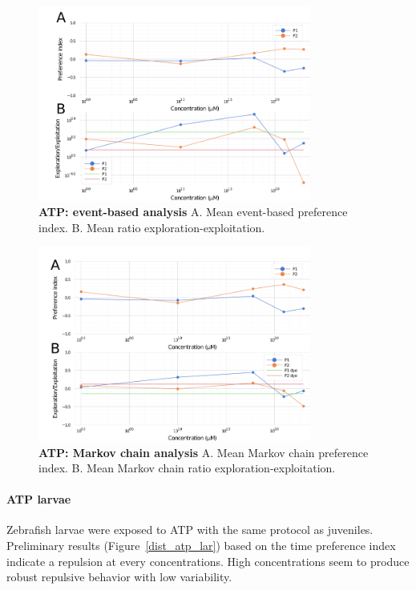     \begin{figure}[h]
      \centering
      \includegraphics[width=0.8\textwidth]{part_2/assets/atp_event.png}
      \caption{\textbf{ATP: event-based analysis} A. Mean event-based preference index. B. Mean ratio exploration-exploitation.}
      \label{atp_event}
    \end{figure}

    \begin{figure}[h]
      \centering
      \includegraphics[width=0.8\textwidth]{part_2/assets/atp_markov.png}
      \caption{\textbf{ATP: Markov chain analysis} A. Mean Markov chain preference index. B. Mean Markov chain ratio exploration-exploitation.}
      \label{atp_markov}
    \end{figure}

    \paragraph{ATP larvae} Zebrafish larvae were exposed to ATP with the same protocol as juveniles. Preliminary results (Figure~\ref{dist_atp_lar}) based on the time preference index indicate a repulsion at every concentrations. High concentrations seem to produce robust repulsive behavior with low variability.


